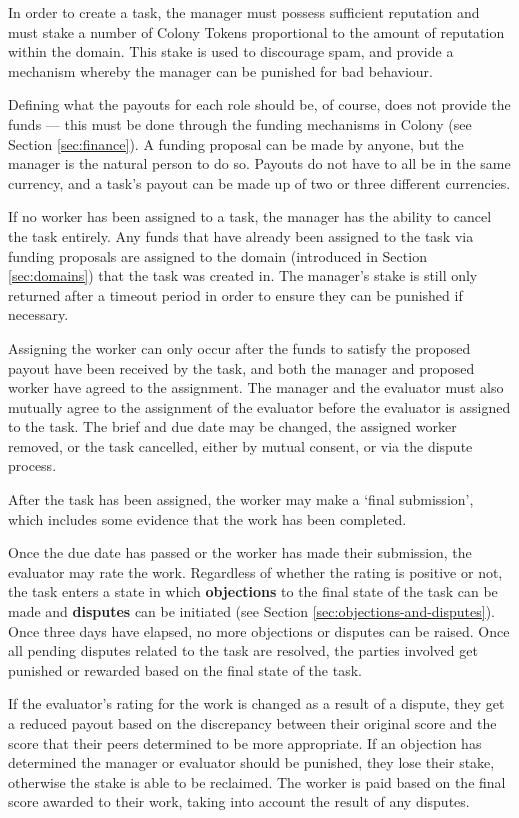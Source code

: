 In order to create a task, the manager must possess sufficient reputation and must stake a number of Colony Tokens proportional to the amount of reputation within the domain. This stake is used to discourage spam, and provide a mechanism whereby the manager can be punished for bad behaviour.

Defining what the payouts for each role should be, of course, does not provide the funds --- this must be done through the funding mechanisms in Colony (see Section \ref{sec:finance}). A funding proposal can be made by anyone, but the manager is the natural person to do so. Payouts do not have to all be in the same currency, and a task's payout can be made up of two or three different currencies.

If no worker has been assigned to a task, the manager has the ability to cancel the task entirely. Any funds that have already been assigned to the task via funding proposals are assigned to the domain (introduced in Section \ref{sec:domains}) that the task was created in. The manager's stake is still only returned after a timeout period in order to ensure they can be punished if necessary.

Assigning the worker can only occur after the funds to satisfy the proposed payout have been received by the task, and both the manager and proposed worker have agreed to the assignment. The manager and the evaluator must also mutually agree to the assignment of the evaluator before the evaluator is assigned to the task. The brief and due date may be changed, the assigned worker removed, or the task cancelled, either by mutual consent, or via the dispute process.

After the task has been assigned, the worker may make a `final submission', which includes some evidence that the work has been completed.

Once the due date has passed or the worker has made their submission, the evaluator may rate the work. Regardless of whether the rating is positive or not, the task enters a state in which \textbf{objections} to the final state of the task can be made and \textbf{disputes} can be initiated (see Section \ref{sec:objections-and-disputes}). Once three days have elapsed, no more objections or disputes can be raised. Once all pending disputes related to the task are resolved, the parties involved get punished or rewarded based on the final state of the task.

If the evaluator's rating for the work is changed as a result of a dispute, they get a reduced payout based on the discrepancy between their original score and the score that their peers determined to be more appropriate. If an objection has determined the manager or evaluator should be punished, they lose their stake, otherwise the stake is able to be reclaimed. The worker is paid based on the final score awarded to their work, taking into account the result of any disputes.

